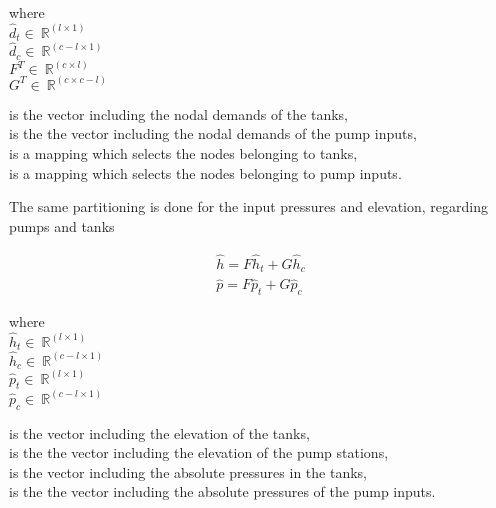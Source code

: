   \begin{minipage}[t]{0.20\textwidth}
where\\
\hspace*{8mm} $\hat{d}_t \in \: \mathbb{R}^{(l \times 1)}$\\
\hspace*{8mm} $\hat{d}_c \in \: \mathbb{R}^{(\!c\!-\!l \times 1\!)}$ \\
\newline
\hspace*{6mm} $F^T \in \: \mathbb{R}^{(c \times l)}$ \\
\hspace*{6mm} $G^T \in \: \mathbb{R}^{(\!c \times c\!-\!l\!)}$
\end{minipage}
\begin{minipage}[t]{0.68\textwidth}
\vspace*{2mm}
is the vector including the nodal demands of the tanks,\\
is the the vector including the nodal demands of the pump inputs, \\
is a mapping which selects the nodes belonging to tanks, \\
is a mapping which selects the nodes belonging to pump inputs.
\end{minipage}

The same partitioning is done for the input pressures and elevation, regarding pumps and tanks

\begin{equation}
\begin{split}
\label{tank_inclusion_separation_of_input_pressure_elevation}
\hat{h} = F \hat{h}_t + G \hat{h}_c \\ 
\hat{p} = F \hat{p}_t + G \hat{p}_c
\end{split}
\end{equation}

 \begin{minipage}[t]{0.20\textwidth}
where\\
\hspace*{8mm} $\hat{h}_t \in \: \mathbb{R}^{(l \times 1)}$\\
\hspace*{8mm} $\hat{h}_c \in \: \mathbb{R}^{(\!c\!-\!l \! \times \! 1\!)}$ \\
\newline
\hspace*{8mm} $\hat{p}_t \in \: \mathbb{R}^{(l \times 1)}$\\
\hspace*{8mm} $\hat{p}_c \in \: \mathbb{R}^{(\!c\!-\!l \times 1\!)}$ 
\end{minipage}
\begin{minipage}[t]{0.68\textwidth}
\vspace*{2mm}
is the vector including the elevation of the tanks,\\
is the the vector including the elevation of the pump stations,\\
is the vector including the absolute pressures in the tanks,\\
is the the vector including the absolute pressures of the pump inputs.
\end{minipage}

